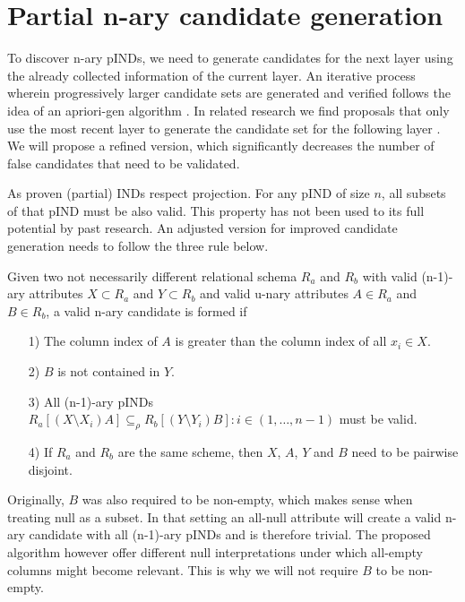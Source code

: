 \section{Partial n-ary candidate generation}
To discover n-ary pINDs, we need to generate candidates for the next layer using the already collected information of the current layer. An iterative process wherein progressively larger candidate sets are generated and verified follows the idea of an apriori-gen algorithm \cite{agrawal1994fast}. In related research we find proposals that only use the most recent layer to generate the candidate set for the following layer \cite{papenbrock2015divide}. We will propose a refined version, which significantly decreases the number of false candidates that need to be validated.

As proven (partial) INDs respect projection. For any pIND of size $n$, all subsets of that pIND must be also valid. This property has not been used to its full potential by past research. An adjusted version for improved candidate generation needs to follow the three rule below.

Given two not necessarily different relational schema $R_a$ and $R_b$ with valid (n-1)-ary attributes $X \subset R_a$ and $Y \subset R_b$ and valid u-nary attributes $A \in R_a$ and $B \in R_b$, a valid n-ary candidate is formed if
\begin{itemize}
    \item[1)] The column index of $A$ is greater than the column index of all $x_i \in X$.
    \item[2)] $B$ is not contained in $Y$.
    \item[3)] All (n-1)-ary pINDs $R_a[(X \setminus X_i)A] \subseteq_\rho R_b[(Y \setminus Y_i)B] : i \in (1, \dots, n-1)$ must be valid.
    \item[4)] If $R_a$ and $R_b$ are the same scheme, then $X$, $A$, $Y$ and $B$ need to be pairwise disjoint.
    
\end{itemize}

Originally, $B$ was also required to be non-empty, which makes sense when treating null as a subset. In that setting an all-null attribute will create a valid n-ary candidate with all (n-1)-ary pINDs and is therefore trivial. The proposed algorithm however offer different null interpretations under which all-empty columns might become relevant. This is why we will not require $B$ to be non-empty.

